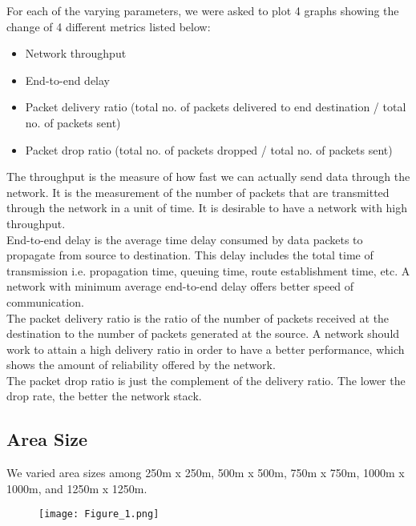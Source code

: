 \documentclass[24pt, a4paper]{article} %
\begin{document}
For each of the varying parameters, we were asked to plot 4 graphs showing the change of 4 different metrics listed below: 

\begin{itemize}
    \item Network throughput
    \item End-to-end delay
    \item Packet delivery ratio (total no. of packets delivered to end destination / total no. of packets sent)
    \item Packet drop ratio (total no. of packets dropped / total no. of packets sent)
\end{itemize}

The throughput is the measure of how fast we can actually send data through the network. It is the measurement of the number of packets that are transmitted through the network in a unit of time. It is desirable to have a network with high throughput. \\

End-to-end delay is the average time delay consumed by data packets to propagate from source to destination. This delay includes the total time of transmission i.e. propagation time, queuing time, route establishment time, etc. A network with minimum average end-to-end delay offers better speed of communication. \\

The packet delivery ratio is the ratio of the number of packets received at the destination to the number of packets generated at the source. A network should work to attain a high delivery ratio in order to have a better performance, which shows the amount of reliability offered by the network. \\

The packet drop ratio is just the complement of the delivery ratio. The lower the drop rate, the better the network stack. \\

\subsection{Area Size}

We varied area sizes among 250m x 250m, 500m x 500m, 750m x 750m, 1000m x 1000m, and 1250m x 1250m.

\begin{figure}[H]
    \centering
    \centering\texttt{[image: Figure\_1.png]}
    \label{fig:1}
\end{figure}
\end{document}
